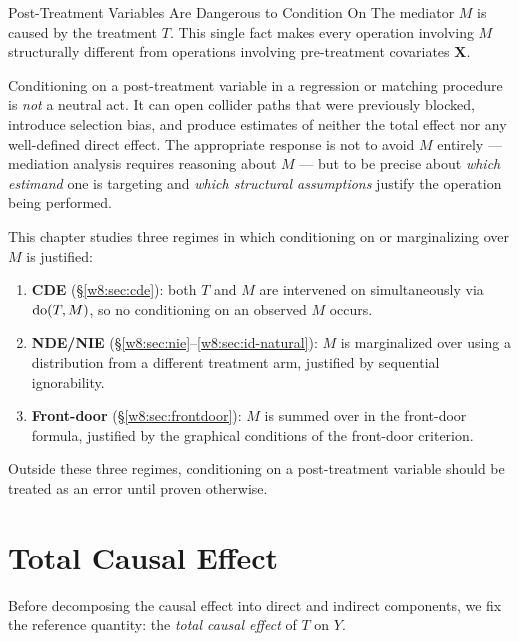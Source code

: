 \documentclass[master.tex]{subfiles}
\begin{document}
\begin{warn}{Post-Treatment Variables Are Dangerous to Condition On}
\label{w8:warn:post-treatment}
The mediator $M$ is caused by the treatment $T$.  This single fact
makes every operation involving $M$ structurally different from
operations involving pre-treatment covariates $\mathbf{X}$.

\medskip\noindent Conditioning on a post-treatment variable in a
regression or matching procedure is \emph{not} a neutral act.  It can
open collider paths that were previously blocked, introduce
selection bias, and produce estimates of neither the total effect nor
any well-defined direct effect.  The appropriate response is not to
avoid $M$ entirely --- mediation analysis requires reasoning about $M$
--- but to be precise about \emph{which estimand} one is targeting and
\emph{which structural assumptions} justify the operation being
performed.

\medskip\noindent This chapter studies three regimes in which
conditioning on or marginalizing over $M$ is justified:
\begin{enumerate}
  \item \textbf{CDE} (§\ref{w8:sec:cde}): both $T$ and $M$ are
    intervened on simultaneously via $\mathrm{do}(T, M)$, so no conditioning
    on an observed $M$ occurs.
  \item \textbf{NDE/NIE} (§\ref{w8:sec:nie}--\ref{w8:sec:id-natural}):
    $M$ is marginalized over using a distribution from a different
    treatment arm, justified by sequential ignorability.
  \item \textbf{Front-door} (§\ref{w8:sec:frontdoor}): $M$ is summed
    over in the front-door formula, justified by the graphical
    conditions of the front-door criterion.
\end{enumerate}
Outside these three regimes, conditioning on a post-treatment variable
should be treated as an error until proven otherwise.
\end{warn}

\section{Total Causal Effect}
\label{w8:sec:te}

Before decomposing the causal effect into direct and indirect
components, we fix the reference quantity: the \emph{total causal
effect} of $T$ on $Y$.
\end{document}
